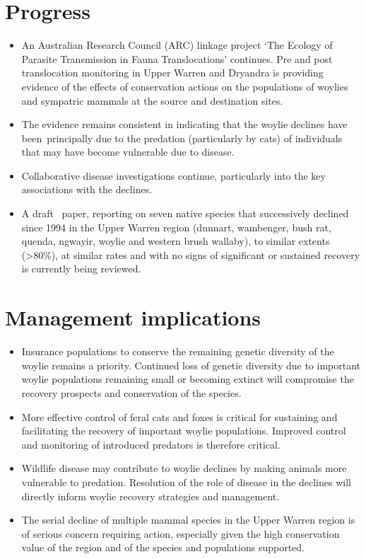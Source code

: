 \documentclass[version=last,
    paper=a4, %
    10pt, %
    usenames,
    dvipsnames,
    oneside, %
    headings=openany, %
    DIV=15 %
]{scrbook}
\begin{document}
\section*{Progress}
\begin{itemize}
\itemsep1pt\parskip0pt
\item
  An Australian Research Council (ARC) linkage project `The Ecology of
  Parasite Transmission in Fauna Translocations' continues. Pre and post
  translocation monitoring in Upper Warren and Dryandra is providing
  evidence of the effects of conservation actions on the populations of
  woylies and sympatric mammals at the source and destination sites.
\item
  The evidence remains consistent in indicating that the woylie declines
  have been~principally due to the predation (particularly by cats) of
  individuals that may have become vulnerable due to disease.
\item
  Collaborative disease investigations continue, particularly into the
  key associations with the declines.
\item
  A draft ~paper, reporting on seven native species that successively
  declined since 1994 in the Upper Warren region (dunnart, wambenger,
  bush rat, quenda, ngwayir, woylie and western brush wallaby), to
  similar extents (\textgreater{}80\%), at similar rates and with no
  signs of significant or sustained recovery is currently being
  reviewed.
\end{itemize}



\section*{Management implications}
\begin{itemize}
\itemsep1pt\parskip0pt
\item
  Insurance populations to conserve the remaining genetic diversity of
  the woylie remains a priority. Continued loss of genetic diversity due
  to important woylie populations remaining small or becoming extinct
  will compromise the recovery prospects and conservation of the
  species.
\item
  More effective control of feral cats and foxes is critical for
  sustaining and facilitating the recovery of important woylie
  populations. Improved control and monitoring of introduced predators
  is therefore critical.
\item
  Wildlife disease may contribute to woylie declines by making animals
  more vulnerable to predation. Resolution of the role of disease in the
  declines will directly inform woylie recovery strategies and
  management.
\item
  The serial decline of multiple mammal species in the Upper Warren
  region is of serious concern requiring action, especially given the
  high conservation value of the region and of the species and
  populations supported.
\end{itemize}
\end{document}
